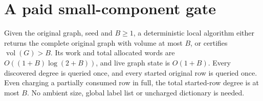 \section{A paid small-component gate}
\label{sec:op3-capped-component-exploration}

\begin{theorem}
\label{thm:op3-capped-component-gate}
Given the original graph, seed and $B\geq1$, a deterministic local
algorithm either returns the complete original graph with volume at
most $B$, or certifies $\operatorname{vol}(G)>B$. Its work and total
allocated words are $O((1+B)\log(2+B))$, and live graph state is
$O(1+B)$. Every discovered degree is queried once, and every started
original row is queried once. Even charging a partially consumed row
in full, the total started-row degree is at most $B$. No ambient size,
global label list or uncharged dictionary is needed.
\end{theorem}
